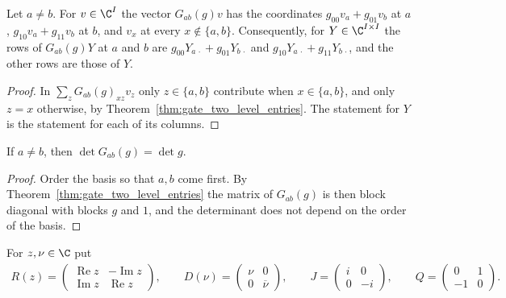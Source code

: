 \begin{theorem}
    \label{thm:gate_two_level_action}
    \leanok
    Let $a\neq b$. For $v\in\C^I$ the vector $G_{ab}(g)v$ has the
    coordinates $g_{00}v_a+g_{01}v_b$ at $a$, $g_{10}v_a+g_{11}v_b$ at $b$,
    and $v_x$ at every $x\notin\{a,b\}$. Consequently, for
    $Y\in\C^{I\times I}$ the rows of $G_{ab}(g)Y$ at $a$ and $b$ are
    $g_{00}Y_{a\,\cdot}+g_{01}Y_{b\,\cdot}$ and
    $g_{10}Y_{a\,\cdot}+g_{11}Y_{b\,\cdot}$, and the other rows are those of
    $Y$.
\end{theorem}
\begin{proof}\leanok
    In $\sum_zG_{ab}(g)_{xz}v_z$ only $z\in\{a,b\}$ contribute when
    $x\in\{a,b\}$, and only $z=x$ otherwise, by
    Theorem~\ref{thm:gate_two_level_entries}. The statement for $Y$ is the
    statement for each of its columns.
\end{proof}

\begin{theorem}
    \label{thm:gate_two_level_det}
    \leanok
    If $a\neq b$, then $\det G_{ab}(g)=\det g$.
\end{theorem}
\begin{proof}\leanok
    Order the basis so that $a,b$ come first. By
    Theorem~\ref{thm:gate_two_level_entries} the matrix of $G_{ab}(g)$ is then
    block diagonal with blocks $g$ and $1$, and the determinant does not
    depend on the order of the basis.
\end{proof}

\begin{definition}
    \label{def:gate_rot_diag}
    \leanok
    For $z,\nu\in\C$ put
    \begin{align}
        R(z)=\begin{pmatrix}\operatorname{Re}z&-\operatorname{Im}z\\
                 \operatorname{Im}z&\operatorname{Re}z\end{pmatrix},
        \qquad
        D(\nu)=\begin{pmatrix}\nu&0\\0&\overline\nu\end{pmatrix},
        \qquad
        J=\begin{pmatrix}i&0\\0&-i\end{pmatrix},
        \qquad
        Q=\begin{pmatrix}0&1\\-1&0\end{pmatrix}.
    \end{align}
\end{definition}

